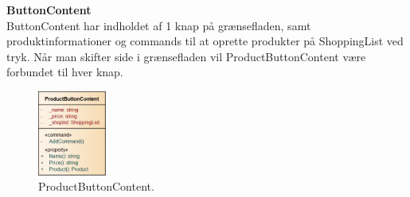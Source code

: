 \textbf{ButtonContent} \\
ButtonContent har indholdet af 1 knap på grænsefladen, samt produktinformationer og commands til at oprette produkter på ShoppingList ved tryk. Når man skifter side i grænsefladen vil ProductButtonContent være forbundet til hver knap.

\begin{figure}[H]
	\centering
	\includegraphics[width=0.2\textwidth]{Systemdesign/Frontend/pics/ProductButtonContent}
	\caption{ProductButtonContent.}
	\label{fig:PBCon}
\end{figure}